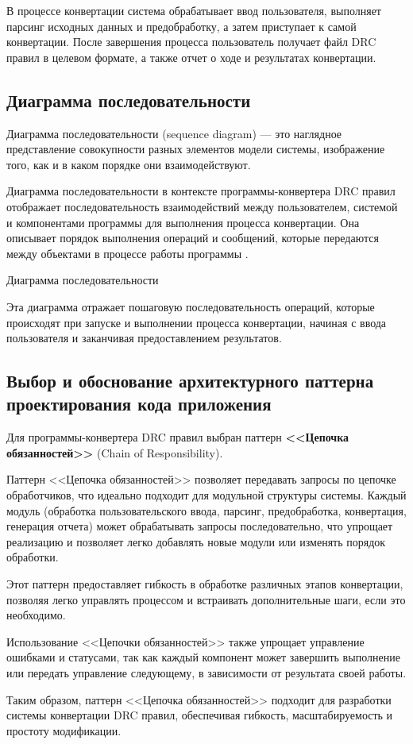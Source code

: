В процессе конвертации система обрабатывает ввод пользователя,
выполняет парсинг исходных данных и предобработку,
а затем приступает к самой конвертации.
После завершения процесса пользователь получает файл DRC правил
в целевом формате, а также отчет о ходе и результатах конвертации.

\subsection{Диаграмма последовательности}

Диаграмма последовательности (sequence diagram) --- это наглядное
представление совокупности разных элементов модели системы,
изображение того, как и в каком порядке они взаимодействуют.

Диаграмма последовательности в контексте программы-конвертера DRC правил
отображает последовательность взаимодействий между пользователем,
системой и компонентами программы для выполнения процесса конвертации.
Она описывает порядок выполнения операций и сообщений,
которые передаются между объектами
в процессе работы программы .

\begin{image}
	\caption{Диаграмма последовательности}
	\label{fig:sequence}
\end{image}

Эта диаграмма отражает пошаговую последовательность операций,
которые происходят при запуске и выполнении процесса конвертации,
начиная с ввода пользователя и заканчивая предоставлением результатов.

\subsection{Выбор и обоснование архитектурного
	паттерна проектирования кода приложения}

Для программы-конвертера DRC правил выбран паттерн
\textbf{<<Цепочка обязанностей>>} (Chain of Responsibility).\par
Паттерн <<Цепочка обязанностей>> позволяет передавать запросы
по цепочке обработчиков,
что идеально подходит для модульной структуры системы.
Каждый модуль (обработка пользовательского ввода, парсинг,
предобработка, конвертация, генерация отчета)
может обрабатывать запросы последовательно,
что упрощает реализацию и позволяет легко добавлять новые модули
или изменять порядок обработки.\par
Этот паттерн предоставляет гибкость в обработке различных этапов конвертации,
позволяя легко управлять процессом и встраивать дополнительные шаги,
если это необходимо.\par
Использование <<Цепочки обязанностей>> также упрощает управление ошибками
и статусами, так как каждый компонент может завершить выполнение
или передать управление следующему,
в зависимости от результата своей работы.\par
Таким образом, паттерн <<Цепочка обязанностей>> подходит
для разработки системы конвертации DRC правил, обеспечивая гибкость,
масштабируемость и простоту модификации.

